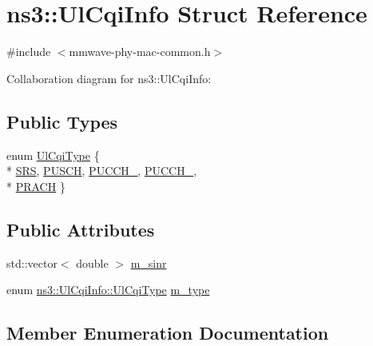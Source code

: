 \hypertarget{structns3_1_1UlCqiInfo}{}\section{ns3\+:\+:Ul\+Cqi\+Info Struct Reference}
\label{structns3_1_1UlCqiInfo}


{\ttfamily \#include $<$mmwave-\/phy-\/mac-\/common.\+h$>$}



Collaboration diagram for ns3\+:\+:Ul\+Cqi\+Info\+:
\subsection*{Public Types}
\begin{DoxyCompactItemize}
\item 
enum \hyperlink{structns3_1_1UlCqiInfo_a8241de30e4fdc8640e892ddf1e2a6c00}{Ul\+Cqi\+Type} \{ \\*
\hyperlink{structns3_1_1UlCqiInfo_a8241de30e4fdc8640e892ddf1e2a6c00ac5314dc3b681fe0d6f3f7c11c8fe1492}{S\+RS}, 
\hyperlink{structns3_1_1UlCqiInfo_a8241de30e4fdc8640e892ddf1e2a6c00a6d4b515df7c45a6843584459fbde26a7}{P\+U\+S\+CH}, 
\hyperlink{structns3_1_1UlCqiInfo_a8241de30e4fdc8640e892ddf1e2a6c00a804e5a286e4cb9382890b25b20b67be0}{P\+U\+C\+C\+H\+\_}, 
\hyperlink{structns3_1_1UlCqiInfo_a8241de30e4fdc8640e892ddf1e2a6c00ac9ced142b5d32c08faee418ca1af07f4}{P\+U\+C\+C\+H\+\_}, 
\\*
\hyperlink{structns3_1_1UlCqiInfo_a8241de30e4fdc8640e892ddf1e2a6c00ac9019920b00841bc946d27cb0d02d239}{P\+R\+A\+CH}
 \}
\end{DoxyCompactItemize}
\subsection*{Public Attributes}
\begin{DoxyCompactItemize}
\item 
std\+::vector$<$ double $>$ \hyperlink{structns3_1_1UlCqiInfo_ad9a153d49c1d34fb7cefb17da1d65152}{m\+\_\+sinr}
\item 
enum \hyperlink{structns3_1_1UlCqiInfo_a8241de30e4fdc8640e892ddf1e2a6c00}{ns3\+::\+Ul\+Cqi\+Info\+::\+Ul\+Cqi\+Type} \hyperlink{structns3_1_1UlCqiInfo_adadce315479d1bbf03550bf4799df6db}{m\+\_\+type}
\end{DoxyCompactItemize}


\subsection{Member Enumeration Documentation}
